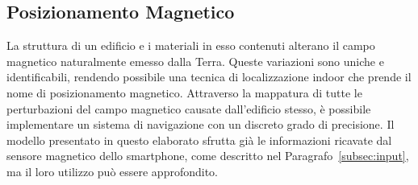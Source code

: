 \subsection{Posizionamento Magnetico}
La struttura di un edificio e i materiali in esso contenuti alterano il campo
magnetico naturalmente emesso dalla Terra. Queste variazioni sono uniche e
identificabili, rendendo possibile una tecnica di localizzazione indoor che
prende il nome di posizionamento magnetico. Attraverso la mappatura di tutte le
perturbazioni del campo magnetico causate dall'edificio stesso, è possibile
implementare un sistema di navigazione con un discreto grado di
precisione\cite{magnetic-positioning}. Il modello presentato in questo
elaborato sfrutta già le informazioni ricavate dal sensore magnetico dello
smartphone, come descritto nel Paragrafo~\ref{subsec:input}, ma il loro utilizzo
può essere approfondito.

